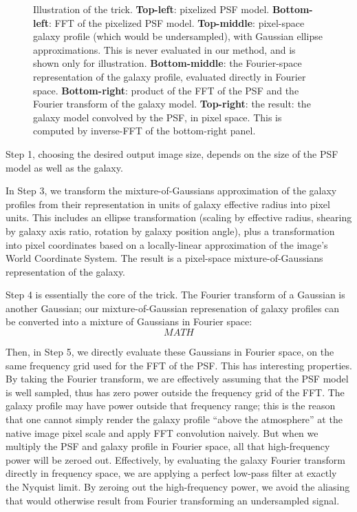 \documentclass[11pt,preprint]{aastex}
\begin{document}
\begin{figure}
\begin{center}
\begin{tabular}{@{}c@{}c@{}c@{}}
    \end{tabular}
  \end{center}
  \caption{\label{fig:example}
    Illustration of the trick.
    \textbf{Top-left}: pixelized PSF model.
    \textbf{Bottom-left}: FFT of the pixelized PSF model.
    \textbf{Top-middle}: pixel-space galaxy profile (which would be
    undersampled), with Gaussian ellipse approximations.  This is
    never evaluated in our method, and is shown only for illustration.
    \textbf{Bottom-middle}: the Fourier-space representation of the
    galaxy profile, evaluated directly in Fourier space.
    \textbf{Bottom-right}: product of the FFT of the PSF and the
    Fourier transform of the galaxy model.
    \textbf{Top-right}: the result: the galaxy model convolved by the
    PSF, in pixel space.  This is computed by inverse-FFT of the
    bottom-right panel.
  }
\end{figure}

Step 1, choosing the desired output image size, depends on the size of
the PSF model as well as the galaxy.

In Step 3, we transform the mixture-of-Gaussians approximation of the
galaxy profiles from their representation in units of galaxy effective
radius into pixel units.  This includes an ellipse transformation
(scaling by effective radius, shearing by galaxy axis ratio, rotation
by galaxy position angle), plus a transformation into pixel
coordinates based on a locally-linear approximation of the image's
World Coordinate System.  
The result is a pixel-space mixture-of-Gaussians representation of the
galaxy.

Step 4 is essentially the core of the trick.  The Fourier transform of
a Gaussian is another Gaussian; our mixture-of-Gaussian represenation
of galaxy profiles can be converted into a mixture of Gaussians in
Fourier space:
\[ MATH \]


Then, in Step 5, we directly evaluate these Gaussians in Fourier
space, on the same frequency grid used for the FFT of the PSF.  This
has interesting properties.  By taking the Fourier transform, we are
effectively assuming that the PSF model is well sampled, thus has zero
power outside the frequency grid of the FFT.  The galaxy profile may
have power outside that frequency range; this is the reason that one
cannot simply render the galaxy profile ``above the atmosphere'' at
the native image pixel scale and apply FFT convolution naively.  But
when we multiply the PSF and galaxy profile in Fourier space, all that
high-frequency power will be zeroed out.  Effectively, by evaluating
the galaxy Fourier transform directly in frequency space, we are
applying a perfect low-pass filter at exactly the Nyquist limit.  By
zeroing out the high-frequency power, we avoid the aliasing that would
otherwise result from Fourier transforming an undersampled signal.
%
\end{document}
